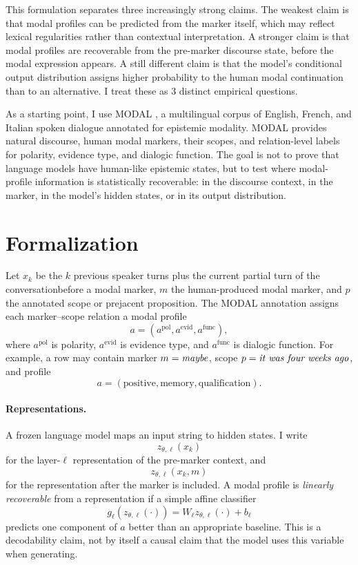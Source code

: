 \documentclass{article}
\begin{document}
This formulation separates three increasingly strong claims. The weakest claim is that modal profiles can be predicted from the marker itself, which may reflect lexical regularities rather than contextual interpretation. A stronger claim is that modal profiles are recoverable from the pre-marker discourse state, before the modal expression appears. A still different claim is that the model's conditional output distribution assigns higher probability to the human modal continuation than to an alternative. I treat these as 3 distinct empirical questions.

As a starting point, I use MODAL \citep{modal_ortolang_2017}, a multilingual corpus of English, French, and Italian spoken dialogue annotated for epistemic modality. MODAL provides natural discourse, human modal markers, their scopes, and relation-level labels for polarity, evidence type, and dialogic function. The goal is not to prove that language models have human-like epistemic states, but to test where modal-profile information is statistically recoverable: in the discourse context, in the marker, in the model's hidden states, or in its output distribution.
\section{Formalization}

Let $x_k$ be the $k$ previous speaker turns plus the current partial turn of the conversationbefore a modal marker, $m$ the human-produced modal marker, and $p$ the annotated scope or prejacent proposition. The MODAL annotation assigns each marker--scope relation a modal profile
\[
  a = (a^{\text{pol}}, a^{\text{evid}}, a^{\text{func}}),
\]
where $a^{\text{pol}}$ is polarity, $a^{\text{evid}}$ is evidence type, and $a^{\text{func}}$ is dialogic function. For example, a row may contain marker $m=\text{\emph{maybe}}$, scope $p=\text{\emph{it was four weeks ago}}$, and profile
\[
a=(\text{positive}, \text{memory}, \text{qualification}).
\]

\paragraph{Representations.}
A frozen language model maps an input string to hidden states. I write
\[
  z_{\theta,\ell}(x_k)
\]
for the layer-$\ell$ representation of the pre-marker context, and
\[
  z_{\theta,\ell}(x_k,m)
\]
for the representation after the marker is included. A modal profile is \emph{linearly recoverable} from a representation if a simple affine classifier
\[
  g_{\ell}(z_{\theta,\ell}(\cdot)) = W_\ell z_{\theta,\ell}(\cdot) + b_\ell
\]
predicts one component of $a$ better than an appropriate baseline. This is a decodability claim, not by itself a causal claim that the model uses this variable when generating.
\end{document}
